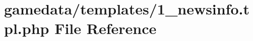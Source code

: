 \hypertarget{1__newsinfo_8tpl_8php}{\section{gamedata/templates/1\+\_\+newsinfo.tpl.\+php File Reference}
\label{1__newsinfo_8tpl_8php}
}
